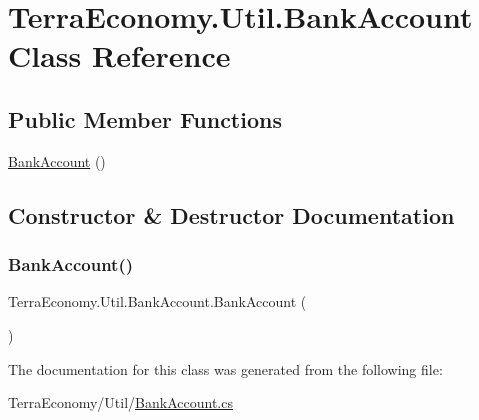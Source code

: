 \hypertarget{class_terra_economy_1_1_util_1_1_bank_account}{}\section{Terra\+Economy.\+Util.\+Bank\+Account Class Reference}
\label{class_terra_economy_1_1_util_1_1_bank_account}
\subsection*{Public Member Functions}
\begin{DoxyCompactItemize}
\item 
\hyperlink{class_terra_economy_1_1_util_1_1_bank_account_aafca5ad9db6b0b777e2565d10f8106b8}{Bank\+Account} ()
\end{DoxyCompactItemize}


\subsection{Constructor \& Destructor Documentation}
\mbox{\label{class_terra_economy_1_1_util_1_1_bank_account_aafca5ad9db6b0b777e2565d10f8106b8}} 
\subsubsection{\texorpdfstring{Bank\+Account()}{BankAccount()}}
{\footnotesize\ttfamily Terra\+Economy.\+Util.\+Bank\+Account.\+Bank\+Account (\begin{DoxyParamCaption}{ }\end{DoxyParamCaption})\hspace{0.3cm}{\ttfamily [inline]}}



The documentation for this class was generated from the following file\+:\begin{DoxyCompactItemize}
\item 
Terra\+Economy/\+Util/\hyperlink{_bank_account_8cs}{Bank\+Account.\+cs}\end{DoxyCompactItemize}
